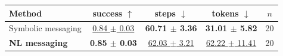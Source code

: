 \begin{tabular}{lcccc}
\toprule
Method & success $\uparrow$ & steps $\downarrow$ & tokens $\downarrow$ & $n$ \\
\midrule
Symbolic messaging & \underline{0.84 $\pm$ 0.03} & \textbf{60.71 $\pm$ 3.36} & \textbf{31.01 $\pm$ 5.82} & 20 \\
\textbf{NL messaging} & \textbf{0.85 $\pm$ 0.03} & \underline{62.03 $\pm$ 3.21} & \underline{62.22 $\pm$ 11.41} & 20 \\
\bottomrule
\end{tabular}
